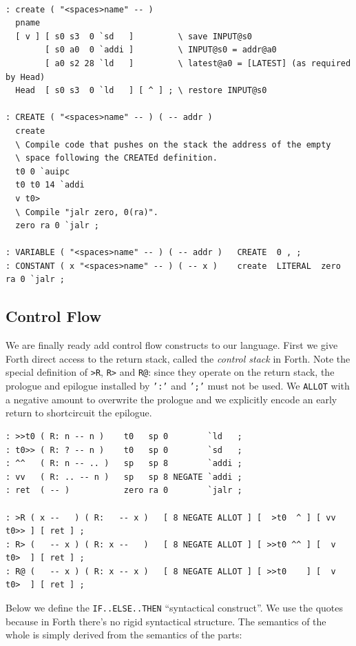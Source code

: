 \documentclass[a4paper,12pt,final]{article}
\begin{document}
\fontsize{9pt}{9.000000pt}\selectfont
\begin{verbatim}

: create ( "<spaces>name" -- )
  pname
  [ v ] [ s0 s3  0 `sd   ]         \ save INPUT@s0
        [ s0 a0  0 `addi ]         \ INPUT@s0 = addr@a0
        [ a0 s2 28 `ld   ]         \ latest@a0 = [LATEST] (as required by Head)
  Head  [ s0 s3  0 `ld   ] [ ^ ] ; \ restore INPUT@s0

: CREATE ( "<spaces>name" -- ) ( -- addr )
  create
  \ Compile code that pushes on the stack the address of the empty
  \ space following the CREATEd definition.
  t0 0 `auipc
  t0 t0 14 `addi
  v t0>
  \ Compile "jalr zero, 0(ra)".
  zero ra 0 `jalr ;

: VARIABLE ( "<spaces>name" -- ) ( -- addr )   CREATE  0 , ;
: CONSTANT ( x "<spaces>name" -- ) ( -- x )    create  LITERAL  zero ra 0 `jalr ;
\end{verbatim}
\normalsize


\subsection{Control Flow}
\label{sec:orgacfbe56}

We are finally ready add control flow constructs to our language.
First we give Forth direct access to the return stack, called the
\emph{control stack} in Forth.  Note the special definition of \texttt{>R}, \texttt{R>}
and \texttt{R@}: since they operate on the return stack, the prologue and
epilogue installed by \texttt{':'} and \texttt{';'} must not be used.  We \texttt{ALLOT}
with a negative amount to overwrite the prologue and we explicitly
encode an early return to shortcircuit the epilogue.

\fontsize{9pt}{9.000000pt}\selectfont
\begin{verbatim}
: >>t0 ( R: n -- n )    t0   sp 0        `ld   ;
: t0>> ( R: ? -- n )    t0   sp 0        `sd   ;
: ^^   ( R: n -- .. )   sp   sp 8        `addi ;
: vv   ( R: .. -- n )   sp   sp 8 NEGATE `addi ;
: ret  ( -- )           zero ra 0        `jalr ;

: >R ( x --   ) ( R:   -- x )   [ 8 NEGATE ALLOT ] [  >t0  ^ ] [ vv t0>> ] [ ret ] ;
: R> (   -- x ) ( R: x --   )   [ 8 NEGATE ALLOT ] [ >>t0 ^^ ] [  v t0>  ] [ ret ] ;
: R@ (   -- x ) ( R: x -- x )   [ 8 NEGATE ALLOT ] [ >>t0    ] [  v t0>  ] [ ret ] ;
\end{verbatim}
\normalsize

Below we define the \texttt{IF..ELSE..THEN} ``syntactical construct''.  We
use the quotes because in Forth there's no rigid syntactical
structure.  The semantics of the whole is simply derived from the
semantics of the parts:
\end{document}

